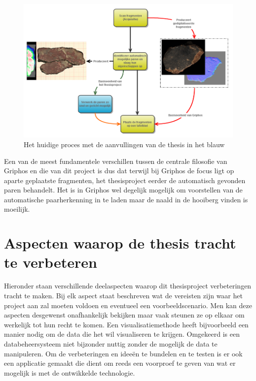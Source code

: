 \begin{figure}[ht]
	\begin{center}
		\includegraphics[width=1.0\columnwidth]{images/flowchart-focus-01.png}
		\caption{Het huidige proces met de aanvullingen van de thesis in het blauw}
		\label{fig:flow}
	\end{center}
\end{figure}

Een van de meest fundamentele verschillen tussen de centrale filosofie van Griphos en die van dit project is dus dat terwijl bij Griphos de focus ligt op aparte geplaatste fragmenten, het thesisproject eerder de automatisch gevonden paren behandelt. Het is in Griphos wel degelijk mogelijk om voorstellen van de automatische paarherkenning in te laden maar de naald in de hooiberg vinden is moeilijk.\\

\section{Aspecten waarop de thesis tracht te verbeteren}
Hieronder staan verschillende deelaspecten waarop dit thesisproject verbeteringen tracht te maken. Bij elk aspect staat beschreven wat de vereisten zijn waar het project aan zal moeten voldoen en eventueel een voorbeeldscenario. Men kan deze aspecten desgewenst onafhankelijk bekijken maar vaak steunen ze op elkaar om werkelijk tot hun recht te komen. Een visualisatiemethode heeft bijvoorbeeld een manier nodig om de data die het wil visualiseren te krijgen. Omgekeerd is een databeheersysteem niet bijzonder nuttig zonder de mogelijk de data te manipuleren. Om de verbeteringen en idee\"en te bundelen en te testen is er ook een applicatie gemaakt die dient om reeds een voorproef te geven van wat er mogelijk is met de ontwikkelde technologie.  


